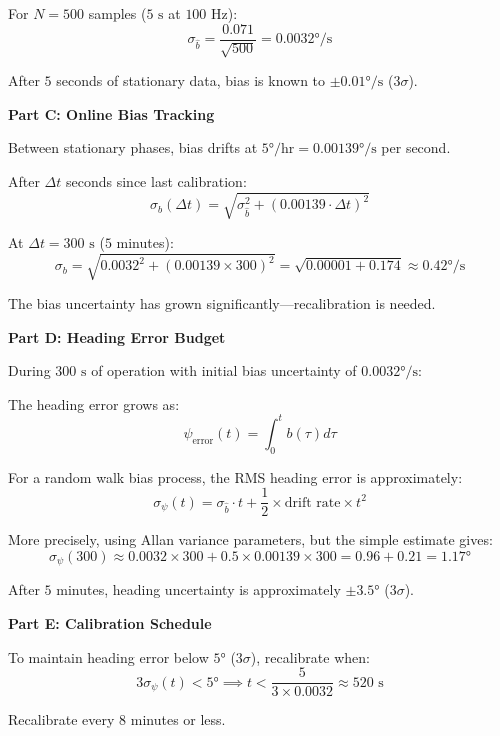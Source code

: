 \begin{example}
For $N = 500$ samples ($5\text{ s}$ at $100\text{ Hz}$):
\begin{equation}
\sigma_{\hat{b}} = \frac{0.071}{\sqrt{500}} = 0.0032°/\text{s}
\end{equation}

After $5$ seconds of stationary data, bias is known to $\pm 0.01°/\text{s}$ ($3\sigma$).

\textbf{Part C: Online Bias Tracking}

Between stationary phases, bias drifts at $5°/\text{hr} = 0.00139°/\text{s}$ per second.

After $\Delta t$ seconds since last calibration:
\begin{equation}
\sigma_b(\Delta t) = \sqrt{\sigma_{\hat{b}}^2 + (0.00139 \cdot \Delta t)^2}
\end{equation}

At $\Delta t = 300\text{ s}$ ($5$ minutes):
\begin{equation}
\sigma_b = \sqrt{0.0032^2 + (0.00139 \times 300)^2} = \sqrt{0.00001 + 0.174} \approx 0.42°/\text{s}
\end{equation}

The bias uncertainty has grown significantly---recalibration is needed.

\textbf{Part D: Heading Error Budget}

During $300\text{ s}$ of operation with initial bias uncertainty of $0.0032°/\text{s}$:

The heading error grows as:
\begin{equation}
\psi_{\text{error}}(t) = \int_0^t b(\tau) d\tau
\end{equation}

For a random walk bias process, the RMS heading error is approximately:
\begin{equation}
\sigma_\psi(t) = \sigma_{\hat{b}} \cdot t + \frac{1}{2} \times \text{drift rate} \times t^2
\end{equation}

More precisely, using Allan variance parameters, but the simple estimate gives:
\begin{equation}
\sigma_\psi(300) \approx 0.0032 \times 300 + 0.5 \times 0.00139 \times 300 = 0.96 + 0.21 = 1.17°
\end{equation}

After $5$ minutes, heading uncertainty is approximately $\pm 3.5°$ ($3\sigma$).

\textbf{Part E: Calibration Schedule}

To maintain heading error below $5°$ ($3\sigma$), recalibrate when:
\begin{equation}
3\sigma_\psi(t) < 5° \implies t < \frac{5}{3 \times 0.0032} \approx 520\text{ s}
\end{equation}

Recalibrate every $8$ minutes or less.
\end{example}

